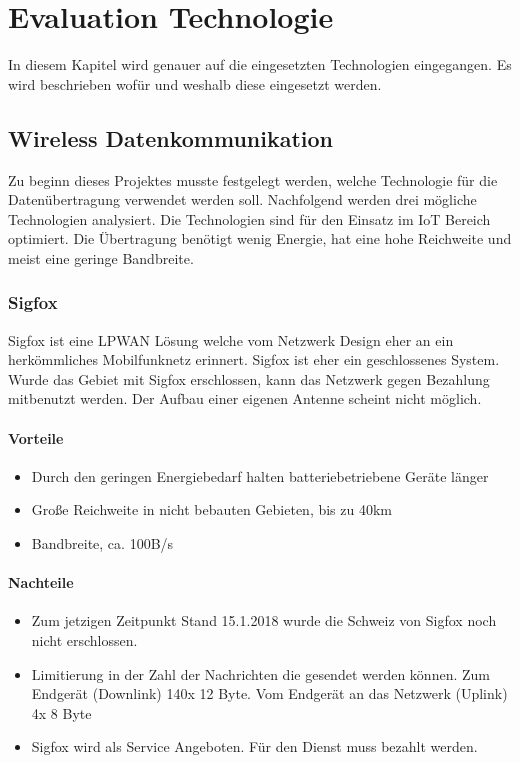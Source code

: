 \documentclass[11pt,english,german]{report}
\theoremstyle{definition}
\begin{document}
\chapter{Evaluation Technologie}
In diesem Kapitel wird genauer auf die eingesetzten Technologien eingegangen. Es wird beschrieben wofür und weshalb diese eingesetzt werden. 

\section{Wireless Datenkommunikation}
Zu beginn dieses Projektes musste festgelegt werden, welche Technologie für die Datenübertragung verwendet werden soll. Nachfolgend werden drei mögliche Technologien analysiert. Die Technologien sind für den Einsatz im IoT Bereich optimiert. Die Übertragung benötigt wenig Energie, hat eine hohe Reichweite und meist eine geringe Bandbreite.

\subsection{Sigfox}
Sigfox ist eine \gls{LPWAN} Lösung welche vom Netzwerk Design eher an ein herkömmliches Mobilfunknetz erinnert. Sigfox ist eher ein geschlossenes System. Wurde das Gebiet mit Sigfox erschlossen, kann das Netzwerk gegen Bezahlung mitbenutzt werden. Der Aufbau einer eigenen Antenne scheint nicht möglich. 

\subsubsection{Vorteile}
\begin{itemize}
	\item Durch den geringen Energiebedarf halten batteriebetriebene Geräte länger
	\item Große Reichweite in nicht bebauten Gebieten, bis zu 40km
	\item Bandbreite, ca. 100B/s
\end{itemize}
\subsubsection{Nachteile}
\begin{itemize}
	\item Zum jetzigen Zeitpunkt Stand 15.1.2018 wurde die Schweiz von Sigfox noch nicht erschlossen.
	\item Limitierung in der Zahl der Nachrichten die gesendet werden können. Zum Endgerät (Downlink) 140x 12 Byte. Vom Endgerät an das Netzwerk (Uplink) 4x 8 Byte
	\item Sigfox wird als Service Angeboten. Für den Dienst muss bezahlt werden.
\end{itemize}
\end{document}
